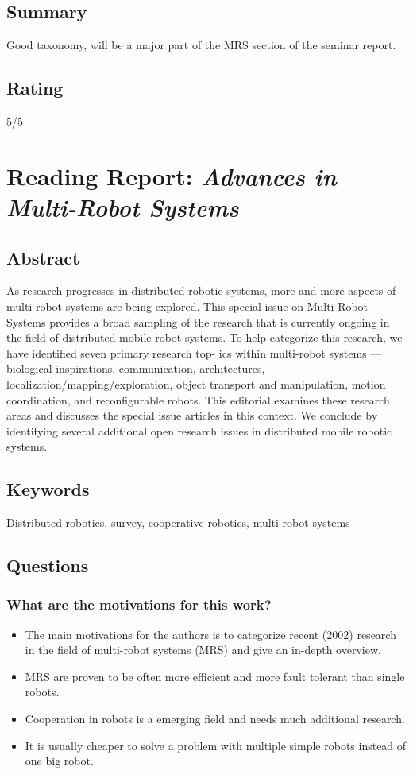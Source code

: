 \documentclass{article}
\begin{document}
\subsection*{Summary}
Good taxonomy, will be a major part of the MRS section of the seminar report.
\subsection*{Rating}
5/5




\section{Reading Report: \emph{Advances in Multi-Robot Systems}}
\cite{Arai2002}

\subsection*{Abstract}
As research progresses in distributed robotic systems, more and more aspects of multi-robot systems are being
explored. This special issue on Multi-Robot Systems provides
a broad sampling of the research that is currently ongoing in
the field of distributed mobile robot systems. To help categorize this research, we have identified seven primary research top-
ics within multi-robot systems — biological inspirations, communication, architectures, localization/mapping/exploration, object
transport and manipulation, motion coordination, and reconfigurable robots. This editorial examines these research areas and
discusses the special issue articles in this context. We conclude by
identifying several additional open research issues in distributed
mobile robotic systems.


\subsection*{Keywords}
Distributed robotics, survey, cooperative robotics, multi-robot systems



\subsection*{Questions}
\subsubsection*{What are the motivations for this work?}
\begin{itemize}
    \item The main motivations for the authors is to categorize recent (2002) research in the field of multi-robot systems (MRS) and give an in-depth overview.
    \item MRS are proven to be often more efficient and more fault tolerant than single robots. 
    \item Cooperation in robots is a emerging field and needs much additional research.
    \item It is usually cheaper to solve a problem with multiple simple robots instead of one big robot.
\end{itemize}
\end{document}
